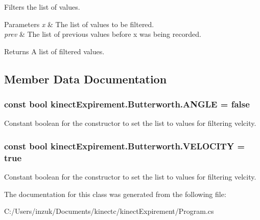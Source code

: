 Filters the list of values. 


\begin{DoxyParams}{Parameters}
{\em x} & The list of values to be filtered. \\
\hline
{\em prev} & The list of previous values before {\ttfamily x} was being recorded. \\
\hline
\end{DoxyParams}
\begin{DoxyReturn}{Returns}
A list of filtered values. 
\end{DoxyReturn}


\subsection{Member Data Documentation}
\subsubsection[{\texorpdfstring{A\+N\+G\+LE}{ANGLE}}]{\setlength{\rightskip}{0pt plus 5cm}const bool kinect\+Expirement.\+Butterworth.\+A\+N\+G\+LE = false}\hypertarget{classkinect_expirement_1_1_butterworth_ac991123445c654cb0da7d7841e313b2c}{}\label{classkinect_expirement_1_1_butterworth_ac991123445c654cb0da7d7841e313b2c}


Constant boolean for the constructor to set the list to values for filtering velcity. 

\subsubsection[{\texorpdfstring{V\+E\+L\+O\+C\+I\+TY}{VELOCITY}}]{\setlength{\rightskip}{0pt plus 5cm}const bool kinect\+Expirement.\+Butterworth.\+V\+E\+L\+O\+C\+I\+TY = true}\hypertarget{classkinect_expirement_1_1_butterworth_afc717929ffc8d554b7e0263e2b06806a}{}\label{classkinect_expirement_1_1_butterworth_afc717929ffc8d554b7e0263e2b06806a}


Constant boolean for the constructor to set the list to values for filtering velcity. 



The documentation for this class was generated from the following file\+:\begin{DoxyCompactItemize}
\item 
C\+:/\+Users/inzuk/\+Documents/kinectc/kinect\+Expirement/Program.\+cs\end{DoxyCompactItemize}
